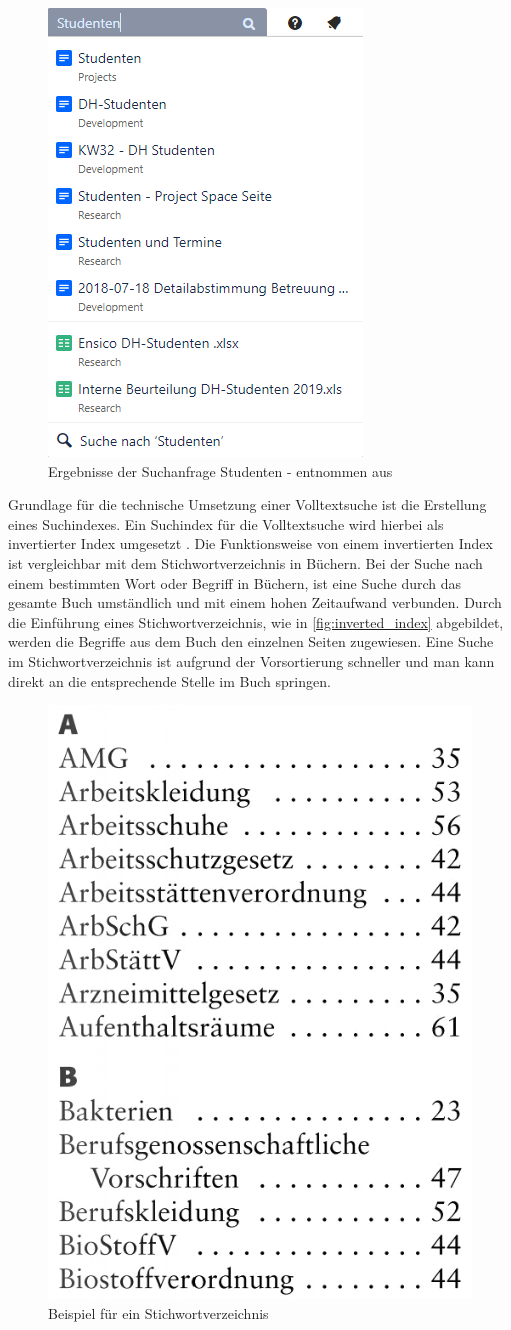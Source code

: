 \begin{figure}[H]
    \centering
    \includegraphics[width=0.4\linewidth]{images/Suchleiste_Confluence.png}
    \caption{Ergebnisse der Suchanfrage \glqq Studenten\grqq{} - entnommen aus \cite{EniscobyForcamGmbH.2021}\protect\footnotemark}
    \label{fig:search_confluence_fulltextsearch}
\end{figure}


Grundlage für die technische Umsetzung einer Volltextsuche ist die Erstellung eines Suchindexes. Ein Suchindex für die Volltextsuche wird hierbei als invertierter Index umgesetzt \cite{SebastianRuss.2017}. Die Funktionsweise von einem invertierten Index ist vergleichbar mit dem Stichwortverzeichnis in Büchern. Bei der Suche nach einem bestimmten Wort oder Begriff in Büchern, ist eine Suche durch das gesamte Buch umständlich und mit einem hohen Zeitaufwand verbunden. Durch die Einführung eines Stichwortverzeichnis, wie in \autoref{fig:inverted_index} abgebildet, werden die Begriffe aus dem Buch den einzelnen Seiten zugewiesen. Eine Suche im Stichwortverzeichnis ist aufgrund der Vorsortierung schneller und man kann direkt an die entsprechende Stelle im Buch springen.

\begin{figure}[H]
    \centering
    \includegraphics[width=0.3\linewidth]{images/Stichwortverzeichnis.png}
    \caption{Beispiel für ein Stichwortverzeichnis \cite{weka.de.2014}}
    \label{fig:inverted_index}
\end{figure}

